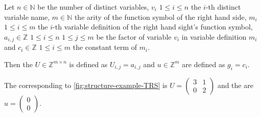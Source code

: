 \begin{definition}
	\label{def:update}
	Let $n \in \mathbb{N}$ be the number of distinct variables, $v_i$ $1 \le i \le n$ the $i$-th distinct		variable name, $m \in \mathbb{N}$ the arity of the function symbol of the right hand side, $m_i$ $1 \le i \le m$ the $i$-th variable definition of the right hand sight's function symbol, $a_{i,j} \in \mathbb{Z}$ $1 \le i \le n$ $1 \le j \le m$ be the factor of variable $v_i$ in variable definition $m_i$ and $c_i \in \mathbb{Z}$ $1 \le i \le m$ the constant term of $m_i$. \newline
	
	Then the \updatematrix $U \in \mathbb{Z}^{m \times n}$ is defined as $U_{i,j}=a_{i,j}$ and \updateconstants $u \in \mathbb{Z}^m$ are defined as $g_i = c_i$.
\end{definition}
\begin{example}
	The corresponding \updatematrix to \autoref{fig:structure-example-TRS} is $U = \begin{pmatrix} 3 & 1 \\ 0 & 2 \end{pmatrix}$ and the \updateconstants are $u = \begin{pmatrix} 0 \\ 0 \end{pmatrix}$.
\end{example}



